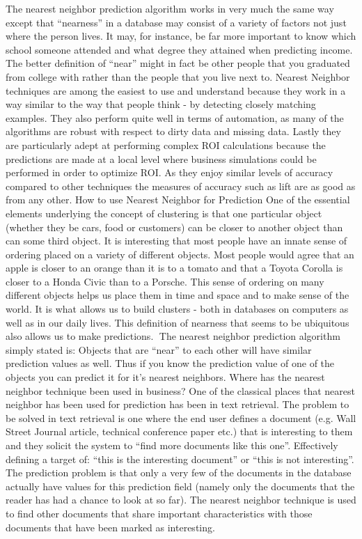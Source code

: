 The nearest neighbor prediction algorithm works in very much the same way except that “nearness” in a database may consist of a variety of factors not just where the person lives.   It may, for instance, be far more important to know which school someone attended and what degree they attained when predicting income.  The better definition of “near” might in fact be other people that you graduated from college with rather than the people that you live next to.
Nearest Neighbor techniques are among the easiest to use and understand because they work in a way similar to the way that people think - by detecting closely matching examples.  They also perform quite well in terms of automation, as many of the algorithms are robust with respect to dirty data and missing data.  Lastly they are particularly adept at performing complex ROI calculations because the predictions are made at a local level where business simulations could be performed in order to optimize ROI.   As they enjoy similar levels of accuracy compared to other techniques the measures of accuracy such as lift are as good as from any other.
How to use Nearest Neighbor for Prediction
One of the essential elements underlying the concept of clustering is that one particular object (whether they be cars, food or customers) can be closer to another object than can some third object.  It is interesting that most people have an innate sense of ordering placed on a variety of different objects.  Most people would agree that an apple is closer to an orange than it is to a tomato and that a Toyota Corolla is closer to a Honda Civic than to a Porsche.  This sense of ordering on many different objects helps us place  them in time and space and to make sense of the world.  It is what allows us to build clusters - both in databases on computers as well as in our daily lives.  This definition of nearness that seems to be ubiquitous also allows us to make predictions.
The nearest neighbor prediction algorithm simply stated is:
Objects that are “near” to each other will have similar prediction values as well.  Thus if you know the prediction value of one of the objects you can predict it for it’s nearest neighbors.
Where has the nearest neighbor technique been used in business?
One of the classical places that nearest neighbor has been used for prediction has been in text retrieval.  The problem to be solved in text retrieval is one where the end user defines a document (e.g. Wall Street Journal article, technical conference paper etc.) that is interesting to them and they solicit the system to “find more documents like this one”.  Effectively defining a target of: “this is the interesting document” or “this is not interesting”.  The prediction problem is that only a very few of the documents in the database actually have values for this prediction field (namely only the documents that the reader has had a chance to look at so far).  The nearest neighbor technique is used to find other documents that share important characteristics with those documents that have been marked as interesting.
